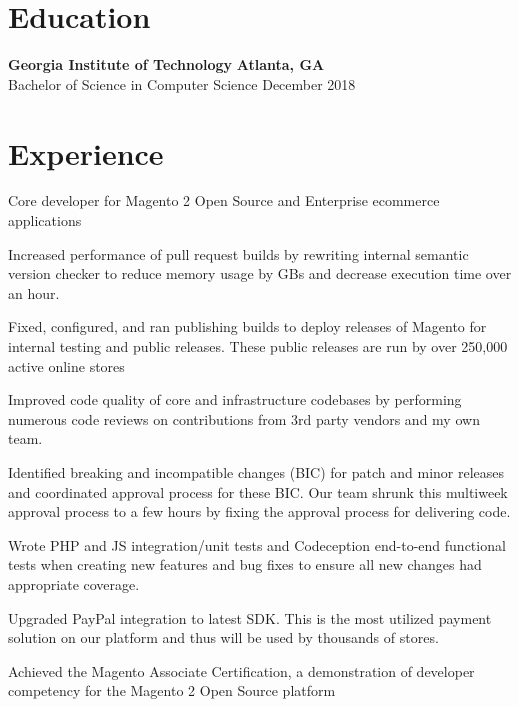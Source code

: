 \documentclass[line]{resume}
\begin{document}
\begin{center}
\end{center}
\section{Education}
\textbf{Georgia Institute of Technology} \hfill \textbf{Atlanta, GA} \\
Bachelor of Science in Computer Science  \hfill December 2018

\vspace{-2px}
\section{Experience}
\vspace{-1px}

\begin{myitemize}
	\item Core developer for Magento 2 Open Source and Enterprise ecommerce applications
	\item Increased performance of pull request builds by rewriting internal semantic version checker to reduce memory usage by GBs and decrease execution time over an hour.
	\item Fixed, configured, and ran publishing builds to deploy releases of Magento for internal testing and public releases. These public releases are run by over 250,000 active online stores
	\item Improved code quality of core and infrastructure codebases by performing numerous code reviews on contributions from 3rd party vendors and my own team.
	\item Identified breaking and incompatible changes (BIC) for patch and minor releases and coordinated approval process for these BIC. Our team shrunk this multiweek approval process to a few hours by fixing the approval process for delivering code.
	\item Wrote PHP and JS integration/unit tests and Codeception end-to-end functional tests when creating new features and bug fixes to ensure all new changes had appropriate coverage.
	\item Upgraded PayPal integration to latest SDK. This is the most utilized payment solution on our platform and thus will be used by thousands of stores.
	\item Achieved the Magento Associate Certification, a demonstration of developer competency for the Magento 2 Open Source platform
\end{myitemize}
\end{document}
